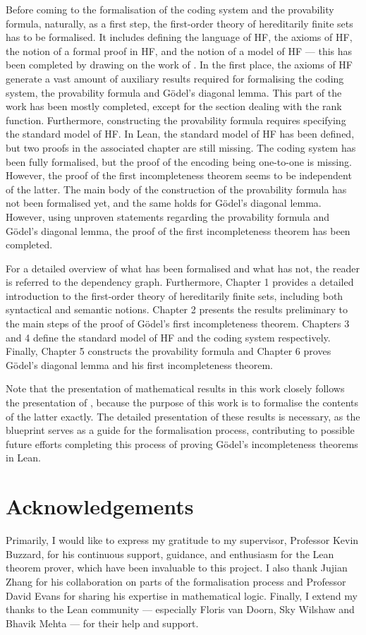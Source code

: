 Before coming to the formalisation of the coding system and the provability formula, naturally,
as a first step, the first-order theory of hereditarily finite sets has to be formalised.
It includes defining the language of HF, the axioms of HF, the notion of a formal proof in HF,
and the notion of a model of HF — this has been completed by drawing on the work of
\cite{han2020formal}.
In the first place, the axioms of HF generate a vast amount of auxiliary results required for 
formalising the coding system, the provability formula and Gödel's diagonal lemma. 
This part of the work has been mostly completed, 
except for the section dealing with the rank function.
Furthermore, constructing the provability formula requires specifying the standard model of HF.
In Lean, the standard model of HF has been defined, but two proofs in the associated chapter
are still missing.
The coding system has been fully formalised, but the proof of the encoding being one-to-one
is missing. However, the proof of the first incompleteness theorem seems to be independent of the
latter.
The main body of the construction of the provability formula has not been formalised yet,
and the same holds for Gödel's diagonal lemma.
However, using unproven statements regarding the provability formula and Gödel's diagonal lemma, 
the proof of the first incompleteness theorem has been completed. 

For a detailed overview of what has been formalised and what has not, 
the reader is referred to the dependency graph.
Furthermore, 
Chapter 1 provides a detailed introduction to the first-order theory of hereditarily finite sets,
including both syntactical and semantic notions.
Chapter 2 presents the results preliminary to the main steps of the proof of Gödel's first
incompleteness theorem.
Chapters 3 and 4 define the standard model of HF and the coding system respectively.
Finally, Chapter 5 constructs the provability formula and Chapter 6
proves Gödel's diagonal lemma and his first incompleteness theorem.

Note that the presentation of mathematical results in this work closely follows the presentation of  
\cite{swierczkowski2003finite}, because the purpose of this work is to formalise 
the contents of the latter exactly.
The detailed presentation of these results is necessary, 
as the blueprint serves as a guide for the formalisation process, 
contributing to possible future efforts completing this process of proving
Gödel's incompleteness theorems in Lean.

\section*{Acknowledgements}

Primarily, I would like to express my gratitude to my supervisor, Professor Kevin Buzzard, 
for his continuous support, guidance, and enthusiasm for the Lean theorem prover, 
which have been invaluable to this project.
I also thank Jujian Zhang for his collaboration on parts of the formalisation process and 
Professor David Evans for sharing his expertise in mathematical logic. 
Finally, I extend my thanks to the Lean community — especially Floris van Doorn, Sky Wilshaw and 
Bhavik Mehta — for their help and support.


